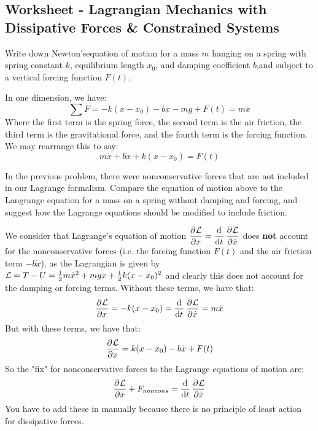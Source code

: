 \subsection{Worksheet - Lagrangian Mechanics with Dissipative Forces \& Constrained Systems}
\begin{p}Write down Newton’sequation of motion for a mass $m$ hanging on a spring with spring constant $k$, equilibrium length $x_0$, and damping coefficient $b$,and subject to a vertical forcing function $F(t)$.
\end{p}
\begin{s}
In one dimension, we have:
\[\sum F = -k(x-x_0) - b\dot{x} - mg + F(t) = m\ddot{x}\]
Where the first term is the spring force, the second term is the air friction, the third term is the gravitational force, and the fourth term is the forcing function. We may rearrange this to say:
\[m\ddot{x} + b\dot{x} + k(x-x_0) = F(t)\]

\end{s}
\begin{p}
In the previous problem, there were nonconservative forces that are not included in our Lagrange formalism. Compare the equation of motion above to the Langrange equation for a mass on a spring without damping and forcing, and suggest how the Lagrange equations should be modified to include friction.
\end{p}
\begin{s}
We consider that Lagrange's equation of motion $\dpd{\LL}{x} = \dod{}{t}\dpd{\LL}{\dot{x}}$ does \textbf{not} account for the nonconservative forces (i.e. the forcing function $F(t)$ and the air friction term $-b\dot{x}$), as the Lagrangian is given by $\mathcal{L} = T - U = \frac{1}{2}m\dot{x}^2 + mgx + \frac{1}{2}k(x-x_0)^2$ and clearly this does not account for the damping or forcing terms. Without these terms, we have that:
\[\dpd{\LL}{x} = -k(x - x_0) = \dod{}{t}\dpd{\LL}{\dot{x}} = m\ddot{x}\]
But with these terms, we have that:
\[\dpd{\LL}{x} = k(x - x_0) - b\dot{x} + F(t)\]
So the "fix" for nonconservative forces to the Lagrange equations of motion are:
\[\dpd{\LL}{x} + F_{noncons} = \dod{}{t}\dpd{\LL}{\dot{x}}\]
You have to add these in manually because there is no principle of least action for dissipative forces.

\end{s}

